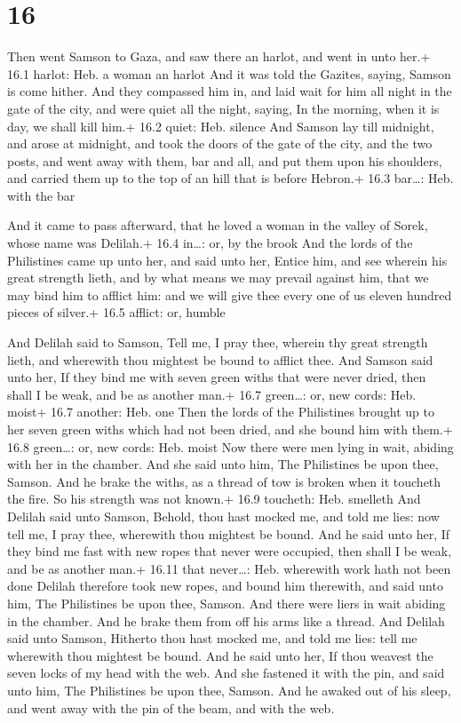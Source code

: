 \hypertarget{section-15}{%
\section{16}\label{section-15}}

 Then went Samson to Gaza, and saw there an harlot, and went
in unto her.+ 16.1 harlot: Heb. a woman an harlot  And it
was told the Gazites, saying, Samson is come hither. And they compassed
him in, and laid wait for him all night in the gate of the city, and
were quiet all the night, saying, In the morning, when it is day, we
shall kill him.+ 16.2 quiet: Heb. silence  And Samson lay
till midnight, and arose at midnight, and took the doors of the gate of
the city, and the two posts, and went away with them, bar and all, and
put them upon his shoulders, and carried them up to the top of an hill
that is before Hebron.+ 16.3 bar\ldots: Heb. with the bar

 And it came to pass afterward, that he loved a woman in
the valley of Sorek, whose name was Delilah.+ 16.4 in\ldots: or, by the
brook  And the lords of the Philistines came up unto her,
and said unto her, Entice him, and see wherein his great strength lieth,
and by what means we may prevail against him, that we may bind him to
afflict him: and we will give thee every one of us eleven hundred pieces
of silver.+ 16.5 afflict: or, humble

 And Delilah said to Samson, Tell me, I pray thee, wherein
thy great strength lieth, and wherewith thou mightest be bound to
afflict thee.  And Samson said unto her, If they bind me
with seven green withs that were never dried, then shall I be weak, and
be as another man.+ 16.7 green\ldots: or, new cords: Heb. moist+ 16.7
another: Heb. one  Then the lords of the Philistines brought
up to her seven green withs which had not been dried, and she bound him
with them.+ 16.8 green\ldots: or, new cords: Heb. moist  Now
there were men lying in wait, abiding with her in the chamber. And she
said unto him, The Philistines be upon thee, Samson. And he brake the
withs, as a thread of tow is broken when it toucheth the fire. So his
strength was not known.+ 16.9 toucheth: Heb. smelleth  And
Delilah said unto Samson, Behold, thou hast mocked me, and told me lies:
now tell me, I pray thee, wherewith thou mightest be bound.
 And he said unto her, If they bind me fast with new ropes
that never were occupied, then shall I be weak, and be as another man.+
16.11 that never\ldots: Heb. wherewith work hath not been done
 Delilah therefore took new ropes, and bound him therewith,
and said unto him, The Philistines be upon thee, Samson. And there were
liers in wait abiding in the chamber. And he brake them from off his
arms like a thread.  And Delilah said unto Samson, Hitherto
thou hast mocked me, and told me lies: tell me wherewith thou mightest
be bound. And he said unto her, If thou weavest the seven locks of my
head with the web.  And she fastened it with the pin, and
said unto him, The Philistines be upon thee, Samson. And he awaked out
of his sleep, and went away with the pin of the beam, and with the web.

